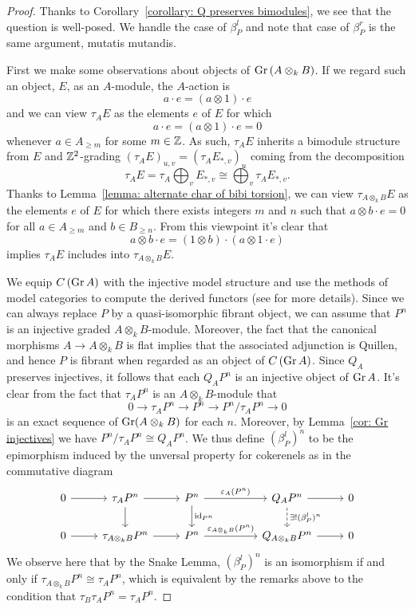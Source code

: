 \begin{proof}%
  Thanks to Corollary~\ref{corollary: Q preserves bimodules}, we see that the question is well-posed. We handle the case of \(\beta^l_P\) and note that case of \(\beta^r_P\) is the same argument, mutatis mutandis.

  First we make some observations about objects of \(\operatorname{Gr}\left(A \otimes_k B\right)\).
  If we regard such an object, \(E\), as an \(A\)-module, the \(A\)-action is
  \[a \cdot e = (a \otimes 1) \cdot e\]
  and we can view \(\tau_A E\) as the elements \(e\) of \(E\) for which
  \[a \cdot e = (a \otimes 1) \cdot e = 0\]
  whenever \(a \in A_{\geq m}\) for some \(m \in \mathbb{Z}\).
  As such, \(\tau_A E\) inherits a bimodule structure from \(E\) and \(\mathbb{Z}^2\)-grading \((\tau_A E)_{u,v} = (\tau_A E_{*,v})_u\) coming from the decomposition
  \[\tau_A E = \tau_A \bigoplus_v E_{\ast,v} \cong \bigoplus_v \tau_A E_{\ast,v}.\]
  Thanks to Lemma~\ref{lemma: alternate char of bibi torsion}, we can view \(\tau_{A \otimes_k B} E\) as the elements \(e\) of \(E\) for which there exists integers \(m\) and \(n\) such that \(a \otimes b \cdot e = 0\) for all \(a \in A_{\geq m}\) and \(b \in B_{\geq n}\).
  From this viewpoint it's clear that
  \[a \otimes b \cdot e = (1 \otimes b) \cdot (a \otimes 1 \cdot e)\]
  implies \(\tau_A E\) includes into \(\tau_{A \otimes_k B} E\).

  We equip \(C\left(\operatorname{Gr}A\right)\) with the injective model structure and use the methods of model categories to compute the derived functors (see \parencite{Hovey01} for more details).
  Since we can always replace \(P\) by a quasi-isomorphic fibrant object, we can assume that \(P^n\) is an injective graded \(A \otimes_k B\)-module.
  Moreover, the fact that the canonical morphisms \(A \to A \otimes_k B\) is flat implies that the associated adjunction is Quillen, and hence \(P\) is fibrant when regarded as an object of  \(C\left(\operatorname{Gr}A\right)\).
  Since \(Q_A\) preserves injectives, it follows that each \(Q_A P^n\) is an injective object of \(\operatorname{Gr}A\).
  It's clear from the fact that \(\tau_A P^n\) is an \(A \otimes_k B\)-module that   \[0 \to \tau_A P^n \to P^n \to P^n/\tau_A P^n \to 0\]
  is an exact sequence of \(\operatorname{Gr}(A \otimes_k B)\) for each \(n\).
  Moreover, by Lemma~\ref{cor: Gr injectives} we have \(P^n/\tau_A P^n \cong Q_A P^n\).
  We thus define \((\beta^l_P)^n\) to be the epimorphism induced by the unversal property for cokerenels as in the commutative diagram
  \[\begin{tikzcd}
  0 \arrow{r} & \tau_{A} P^n \arrow{d}\arrow{r} & P^n \arrow{d}{\id_{P^n}}\arrow{rr}{\varepsilon_{A}(P^n)} && Q_{A} P^n \arrow{r}\arrow[dashed]{d}{\exists ! (\beta^l_P)^n} & 0\\
  0 \arrow{r} & \tau_{A \otimes_k B} P^n \arrow{r} & P^n\arrow{rr}{\varepsilon_{A \otimes_k B}(P^n)} && Q_{A \otimes_k B} P^n \arrow{r} & 0 
  \end{tikzcd}\]  We observe here that by the Snake Lemma, \((\beta^l_P)^n\) is an isomorphism if and only if \(\tau_{A \otimes_k B} P^n \cong \tau_A P^n\), which is equivalent by the remarks above to the condition that \(\tau_B \tau_A P^n = \tau_A P^n\).


\end{proof}
